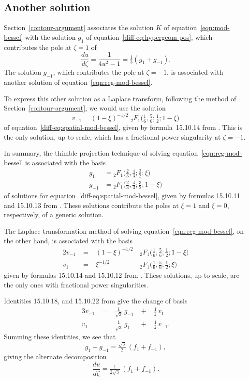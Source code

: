 \documentclass{article}
\theoremstyle{definition}
\begin{document}
\subsection{Another solution}
Section~\ref{contour-argument} associates the solution $K$ of equation~\eqref{eqn:mod-bessel} with the solution $g_1$ of equation~\eqref{diff-eq:hypergeom-pos}, which contributes the pole at $\zeta = 1$ of
\[ \frac{du}{d\zeta} = \frac{1}{4u^2 - 1} = \tfrac{1}{3}(g_1 + g_{-1}). \]
The solution $g_{-1}$, which contributes the pole at $\zeta = -1$, is associated with another solution of equation~\eqref{eqn:reg-mod-bessel}.

To express this other solution as a Laplace transform, following the method of Section~\ref{contour-argument}, we would use the solution
\[ v_{-1} = (1-\xi)^{-1/2} \,\, {}_2F_1\big(\tfrac{1}{6}, \tfrac{5}{6}; \tfrac{1}{2}; 1-\xi\big) \]
of equation~\eqref{diff-eq:spatial-mod-bessel}, given by formula~15.10.14 from \cite{dlmf}. This is the only solution, up to scale, which has a fractional power singularity at $\zeta = -1$.

In summary, the thimble projection technique of solving equation~\eqref{eqn:reg-mod-bessel} is associated with the basis
\begin{align*}
g_{1} & = {}_2F_1\big(\tfrac{2}{3}, \tfrac{4}{3}; \tfrac{3}{2}; \xi\big) \\
g_{-1} & = {}_2F_1\big(\tfrac{2}{3}, \tfrac{4}{3}; \tfrac{3}{2}; 1-\xi\big)
\end{align*}
of solutions for equation~\eqref{diff-eq:spatial-mod-bessel}, given by formulas 15.10.11 and 15.10.13 from \cite{dlmf}. These solutions contribute the poles at $\xi = 1$ and $\xi = 0$, respectively, of a generic solution.

The Laplace transformation method of solving equation~\eqref{eqn:reg-mod-bessel}, on the other hand, is associated with the basis
\begin{alignat*}{2}
v_{-1} &\;=\;& (1-\xi)^{-1/2} & \, {}_2F_1\big(\tfrac{1}{6}, \tfrac{5}{6}; \tfrac{1}{2}; 1-\xi\big) \\
v_1 &\;=\:& \xi^{-1/2} & \, {}_2F_1\big(\tfrac{1}{6}, \tfrac{5}{6}; \tfrac{1}{2}; \xi\big)
\end{alignat*}
given by formulas 15.10.14 and 15.10.12 from \cite{dlmf}. These solutions, up to scale, are the only ones with fractional power singularities.

Identities 15.10.18, and 15.10.22 from \cite{dlmf} give the change of basis
\begin{alignat*}{3}
v_{-1} &\;=\;&\tfrac{1}{\sqrt{3}}\,g_{-1} &\;+\;& \tfrac{1}{2}\,v_1 \\
v_1 &\;=\;& \tfrac{1}{\sqrt{3}}\,g_{1} &\;+\;& \tfrac{1}{2}\,v_{-1}.
\end{alignat*}
Summing these identities, we see that
\[ g_1 + g_{-1} = \tfrac{\sqrt{3}}{2}\,(f_1 + f_{-1}), \]
giving the alternate decomposition
\[ \frac{du}{d\zeta} = \tfrac{1}{2\sqrt{3}}\,(f_1 + f_{-1}). \]
\end{document}
